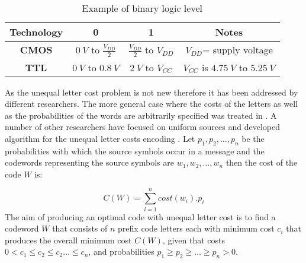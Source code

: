 \documentclass[preprint,12pt]{elsarticle}
\begin{document}
\begin{table}[thpb]
\renewcommand{\arraystretch}{1.5}
\caption{Example of binary logic level}
\label{table1}
\centering
\begin{tabular}{c c c c}
\hline
 \bfseries Technology  & 0 & 1&Notes\\
\hline
\bfseries CMOS & $0~V$ to $\frac{V_{DD}}{2}$&$\frac{V_{DD}}{2}$ to $V_{DD}$&$V_{DD}$= supply voltage\\
\bfseries TTL & $0~V$ to $0.8~V$&$2~V$ to $V_{CC}$ &$V_{CC}$ is $4.75~V$ to $5.25~V$\\


\hline
\end{tabular}
\end{table}

As the unequal letter cost problem is not new therefore it has been addressed by different researchers. The more general case where the costs of the letters as well as the probabilities of the words are arbitrarily specified was treated in \cite{Karp61}. A number of other researchers have focused on uniform sources and developed algorithm for the unequal letter costs encoding \cite{Gil95, Kar62,Varn71,AltMel80,perl1975}.  Let $p_1,p_2,\ldots,p_n$ be the probabilities with which the source symbols occur in a message and the codewords representing the source symbols are $w_1,w_2,\ldots,w_n$ then the cost of the code $W$ is:

\begin{equation}
C\left(W\right)=\sum_{i=1}^{n}cost\left(w_i\right).p_i 
\end{equation}
The aim of producing an optimal code with unequal letter cost is to find a codeword $W$ that consists of $n$ prefix code letters each with minimum cost $c_i$ that produces the overall minimum cost $C\left(W\right)$, given that costs $0<c_1\leq c_2 \leq c_2 \ldots \leq c_n$, and probabilities $p_1\geq p_2\geq \ldots\geq p_n>0$.
\end{document}
